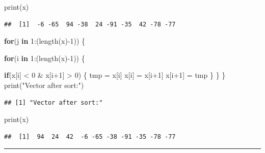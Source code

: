 \documentclass[
]{book}
\newenvironment{Shaded}{\begin{snugshade}}{\end{snugshade}}
\newcommand{\ControlFlowTok}[1]{\textcolor[rgb]{0.13,0.29,0.53}{\textbf{#1}}}
\newcommand{\DecValTok}[1]{\textcolor[rgb]{0.00,0.00,0.81}{#1}}
\newcommand{\FunctionTok}[1]{\textcolor[rgb]{0.00,0.00,0.00}{#1}}
\newcommand{\NormalTok}[1]{#1}
\newcommand{\OtherTok}[1]{\textcolor[rgb]{0.56,0.35,0.01}{#1}}
\newcommand{\SpecialCharTok}[1]{\textcolor[rgb]{0.00,0.00,0.00}{#1}}
\newcommand{\StringTok}[1]{\textcolor[rgb]{0.31,0.60,0.02}{#1}}
\begin{document}
\begin{Shaded}
\begin{Highlighting}[]
\FunctionTok{print}\NormalTok{(x)}
\end{Highlighting}
\end{Shaded}

\begin{verbatim}
##  [1]  -6 -65  94 -38  24 -91 -35  42 -78 -77
\end{verbatim}

\begin{Shaded}
\begin{Highlighting}[]
\ControlFlowTok{for}\NormalTok{(j }\ControlFlowTok{in} \DecValTok{1}\SpecialCharTok{:}\NormalTok{(}\FunctionTok{length}\NormalTok{(x)}\SpecialCharTok{{-}}\DecValTok{1}\NormalTok{)) \{}
  
  \ControlFlowTok{for}\NormalTok{(i }\ControlFlowTok{in} \DecValTok{1}\SpecialCharTok{:}\NormalTok{(}\FunctionTok{length}\NormalTok{(x)}\SpecialCharTok{{-}}\DecValTok{1}\NormalTok{)) \{}
    
    \ControlFlowTok{if}\NormalTok{(x[i] }\SpecialCharTok{\textless{}} \DecValTok{0} \SpecialCharTok{\&}\NormalTok{ x[i}\SpecialCharTok{+}\DecValTok{1}\NormalTok{] }\SpecialCharTok{\textgreater{}} \DecValTok{0}\NormalTok{) \{}
\NormalTok{      tmp }\OtherTok{=}\NormalTok{ x[i]}
\NormalTok{      x[i] }\OtherTok{=}\NormalTok{ x[i}\SpecialCharTok{+}\DecValTok{1}\NormalTok{]}
\NormalTok{      x[i}\SpecialCharTok{+}\DecValTok{1}\NormalTok{] }\OtherTok{=}\NormalTok{ tmp}
\NormalTok{    \}}
\NormalTok{  \}}
\NormalTok{\}}
\FunctionTok{print}\NormalTok{(}\StringTok{"Vector after sort:"}\NormalTok{)}
\end{Highlighting}
\end{Shaded}

\begin{verbatim}
## [1] "Vector after sort:"
\end{verbatim}

\begin{Shaded}
\begin{Highlighting}[]
\FunctionTok{print}\NormalTok{(x)}
\end{Highlighting}
\end{Shaded}

\begin{verbatim}
##  [1]  94  24  42  -6 -65 -38 -91 -35 -78 -77
\end{verbatim}

\begin{center}\rule{0.5\linewidth}{0.5pt}\end{center}
\end{document}
